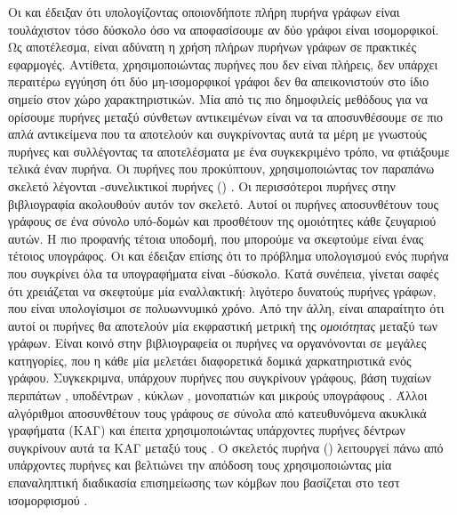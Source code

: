 Οι  και  \cite{Gartner03ongraph} έδειξαν ότι υπολογίζοντας οποιονδήποτε πλήρη πυρήνα γράφων είναι τουλάχιστον τόσο δύσκολο όσο να αποφασίσουμε αν δύο γράφοι είναι ισομορφικοί.
Ως αποτέλεσμα, είναι αδύνατη η χρήση πλήρων πυρήνων γράφων σε πρακτικές εφαρμογές.
Αντίθετα, χρησιμοποιώντας πυρήνες που δεν είναι πλήρεις, δεν υπάρχει περαιτέρω εγγύηση ότι δύο μη-ισομορφικοί γράφοι δεν θα απεικονιστούν στο ίδιο σημείο στον χώρο χαρακτηριστικών.
Μία από τις πιο δημοφιλείς μεθόδους για να ορίσουμε πυρήνες μεταξύ σύνθετων αντικειμένων  είναι να τα αποσυνθέσουμε σε πιο απλά αντικείμενα που τα αποτελούν και συγκρίνοντας αυτά τα μέρη με γνωστούς πυρήνες και συλλέγοντας τα αποτελέσματα με ένα συγκεκριμένο τρόπο, να φτιάξουμε τελικά έναν πυρήνα.
Οι πυρήνες που προκύπτουν, χρησιμοποιώντας τον παραπάνω σκελετό λέγονται -συνελικτικοί πυρήνες () \cite{Haussler1999ConvolutionKO}.
Οι περισσότεροι πυρήνες στην βιβλιογραφία ακολουθούν αυτόν τον σκελετό.
Αυτοί οι πυρήνες αποσυνθέτουν τους γράφους σε ένα σύνολο υπό-δομών και προσθέτουν της ομοιότητες κάθε ζευγαριού αυτών.
Η πιο προφανής τέτοια υποδομή, που μπορούμε να σκεφτούμε είναι ένας τέτοιος υπογράφος. Οι  και  έδειξαν επίσης ότι το πρόβλημα υπολογισμού ενός πυρήνα που συγκρίνει όλα τα υπογραφήματα είναι -δύσκολο.
Κατά συνέπεια, γίνεται σαφές ότι χρειάζεται να σκεφτούμε μία εναλλακτική: λιγότερο δυνατούς πυρήνες γράφων, που είναι υπολογίσιμοι σε πολυωννυμικό χρόνο.
Από την άλλη, είναι απαραίτητο ότι αυτοί οι πυρήνες θα αποτελούν μία εκφραστική μετρική της \textit{ομοιότητας} μεταξύ των γράφων.
Είναι κοινό στην βιβλιογραφεία οι πυρήνες να οργανόνονται σε μεγάλες κατηγορίες, που η κάθε μία μελετάει διαφορετικά δομικά χαρκατηριστικά ενός γράφου.
Συγκεκριμνα, υπάρχουν πυρήνες που συγκρίνουν γράφους, βάση τυχαίων περιπάτων \cite{gartner2003graph, borgwardt2005protein, vishwanathan2010graph}, υποδέντρων \cite{Ramon03expressivityversus, Bach2008, Mahe2009}, κύκλων \cite{Horvath2004}, μονοπατιών \cite{Borgwardt2005, Giscard2017} και μικρούς υπογράφους \cite{Costa2010, Hido2009, Kriege2012SubgraphMK, shervashidze2009efficient}.
Άλλοι αλγόριθμοι αποσυνθέτουν τους γράφους σε σύνολα από κατευθυνόμενα ακυκλικά γραφήματα (ΚΑΓ) και έπειτα χρησιμοποιώντας υπάρχοντες πυρήνες δέντρων συγκρίνουν αυτά τα ΚΑΓ μεταξύ τους \cite{Martino2006}.
Ο σκελετός πυρήνα ()  λειτουργεί πάνω από υπάρχοντες πυρήνες και βελτιώνει την απόδοση τους χρησιμοποιώντας μία επαναληπτική διαδικασία επισημείωσης των κόμβων που βασίζεται στο τεστ ισομορφισμού  \cite{shervashidze2011weisfeiler}.
